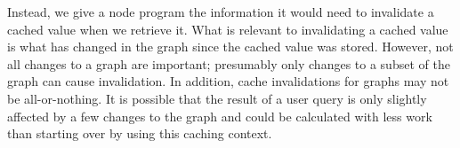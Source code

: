 \documentclass[letterpaper,twocolumn,11pt,tight]{article}
\begin{document}

Instead, we give a node program the information it would need to invalidate a cached value when we retrieve it.
What is relevant to invalidating a cached value is what has changed in the graph since the cached value was stored.
However, not all changes to a graph are important; presumably only changes to a subset of the graph can cause invalidation.
In addition, cache invalidations for graphs may not be all-or-nothing.
It is possible that the result of a user query is only slightly affected by a few changes to the graph and could be calculated with less work than starting over by using this caching context.
\end{document}
